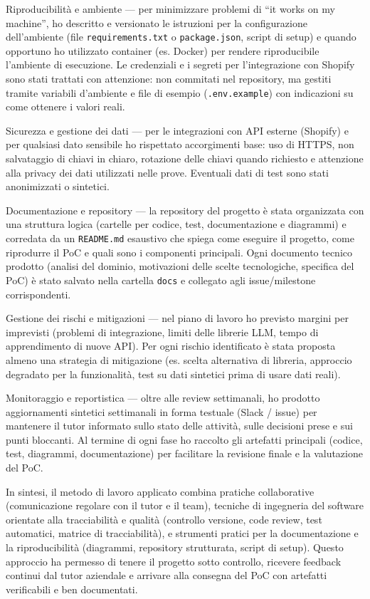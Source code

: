 Riproducibilità e ambiente — per minimizzare problemi di “it works on my machine”, ho descritto e versionato le istruzioni per la configurazione dell'ambiente 
(file \texttt{requirements.txt} o \texttt{package.json}, script di setup) e quando opportuno ho utilizzato container (es. Docker) per rendere riproducibile l'ambiente di esecuzione. 
Le credenziali e i segreti per l'integrazione con Shopify sono stati trattati con attenzione: non commitati nel repository, 
ma gestiti tramite variabili d'ambiente e file di esempio (\texttt{.env.example}) con indicazioni su come ottenere i valori reali.

Sicurezza e gestione dei dati — per le integrazioni con API esterne (Shopify) e per qualsiasi dato sensibile ho rispettato accorgimenti base: 
uso di HTTPS, non salvataggio di chiavi in chiaro, rotazione delle chiavi quando richiesto e attenzione alla privacy dei dati utilizzati nelle prove. 
Eventuali dati di test sono stati anonimizzati o sintetici.

Documentazione e repository — la repository del progetto è stata organizzata con una struttura logica (cartelle per codice, test, documentazione e diagrammi) 
e corredata da un \texttt{README.md} esaustivo che spiega come eseguire il progetto, come riprodurre il PoC e quali sono i componenti principali. 
Ogni documento tecnico prodotto (analisi del dominio, motivazioni delle scelte tecnologiche, specifica del PoC) è stato salvato nella cartella \texttt{docs} 
e collegato agli issue/milestone corrispondenti.

Gestione dei rischi e mitigazioni — nel piano di lavoro ho previsto margini per imprevisti (problemi di integrazione, limiti delle librerie LLM, tempo di apprendimento di nuove API). 
Per ogni rischio identificato è stata proposta almeno una strategia di mitigazione (es. scelta alternativa di libreria, approccio degradato per la funzionalità, 
test su dati sintetici prima di usare dati reali).

Monitoraggio e reportistica — oltre alle review settimanali, ho prodotto aggiornamenti sintetici settimanali in forma testuale (Slack / issue) 
per mantenere il tutor informato sullo stato delle attività, sulle decisioni prese e sui punti bloccanti. Al termine di ogni fase ho raccolto gli artefatti principali 
(codice, test, diagrammi, documentazione) per facilitare la revisione finale e la valutazione del PoC.

In sintesi, il metodo di lavoro applicato combina pratiche collaborative (comunicazione regolare con il tutor e il team), 
tecniche di ingegneria del software orientate alla tracciabilità e qualità (controllo versione, code review, test automatici, matrice di tracciabilità), 
e strumenti pratici per la documentazione e la riproducibilità (diagrammi, repository strutturata, script di setup). 
Questo approccio ha permesso di tenere il progetto sotto controllo, ricevere feedback continui dal tutor aziendale e arrivare alla consegna del PoC con artefatti verificabili e ben documentati.


